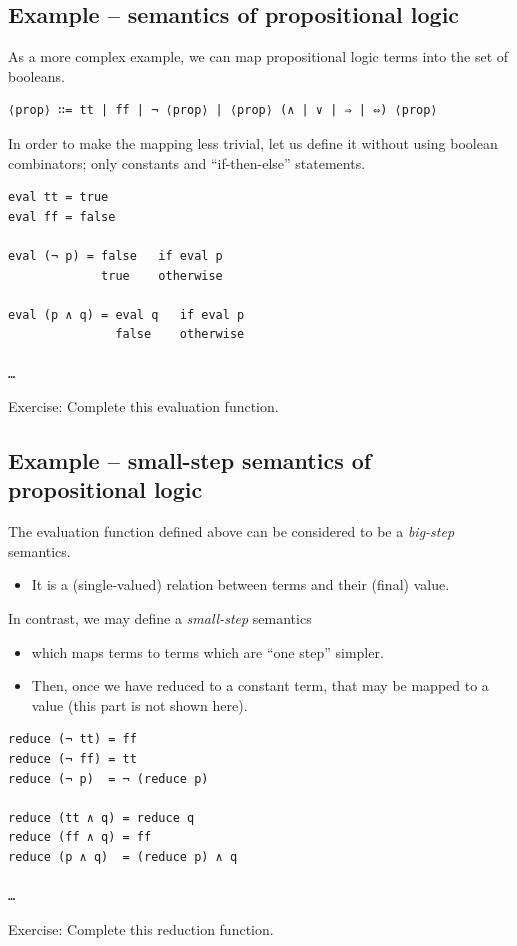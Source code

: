 \documentclass[11pt]{article}
\theoremstyle{definition}
\begin{document}
\subsection{Example – semantics of propositional logic}
\label{sec:org0e35420}
As a more complex example, we can map propositional logic terms
into the set of booleans.
\begin{verbatim}
⟨prop⟩ ∷= tt | ff | ¬ ⟨prop⟩ | ⟨prop⟩ (∧ | ∨ | ⇒ | ⇔) ⟨prop⟩
\end{verbatim}

In order to make the mapping less trivial, let us define it
without using boolean combinators; only constants
and “if-then-else” statements.
\begin{verbatim}
eval tt = true
eval ff = false

eval (¬ p) = false   if eval p
             true    otherwise

eval (p ∧ q) = eval q   if eval p
               false    otherwise

…
\end{verbatim}
Exercise: Complete this evaluation function.

\subsection{Example – small-step semantics of propositional logic}
\label{sec:org17308c4}
The evaluation function defined above can be considered
to be a \emph{big-step} semantics.
\begin{itemize}
\item It is a (single-valued) relation between terms and
their (final) value.
\end{itemize}

In contrast, we may define a \emph{small-step} semantics
\begin{itemize}
\item which maps terms to terms which are “one step” simpler.
\item Then, once we have reduced to a constant term, that may be mapped
to a value (this part is not shown here).
\end{itemize}
\begin{verbatim}
reduce (¬ tt) = ff
reduce (¬ ff) = tt
reduce (¬ p)  = ¬ (reduce p)

reduce (tt ∧ q) = reduce q
reduce (ff ∧ q) = ff
reduce (p ∧ q)  = (reduce p) ∧ q

…
\end{verbatim}
Exercise: Complete this reduction function.
\end{document}
